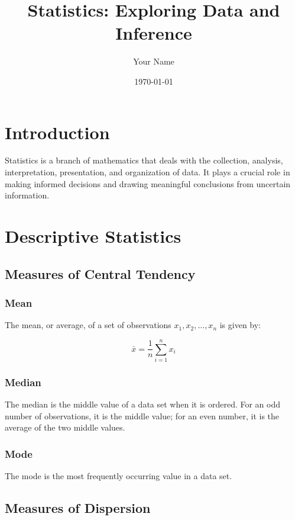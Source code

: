\documentclass{article}
\title{Statistics: Exploring Data and Inference}
\author{Your Name}
\date{\today}
\begin{document}
\maketitle

\section{Introduction}

Statistics is a branch of mathematics that deals with the collection, analysis, interpretation, presentation, and organization of data. It plays a crucial role in making informed decisions and drawing meaningful conclusions from uncertain information.

\section{Descriptive Statistics}

\subsection{Measures of Central Tendency}

\subsubsection{Mean}

The mean, or average, of a set of observations $x_1, x_2, \ldots, x_n$ is given by:

\begin{equation}
    \bar{x} = \frac{1}{n} \sum_{i=1}^{n} x_i
\end{equation}

\subsubsection{Median}

The median is the middle value of a data set when it is ordered. For an odd number of observations, it is the middle value; for an even number, it is the average of the two middle values.

\subsubsection{Mode}

The mode is the most frequently occurring value in a data set.

\subsection{Measures of Dispersion}
\end{document}
